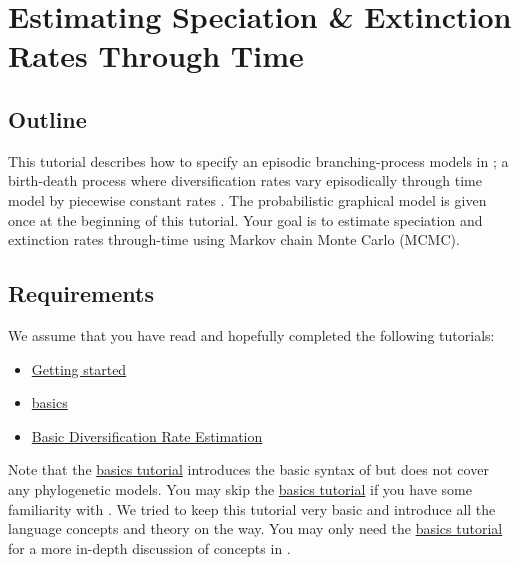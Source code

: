 \section{Estimating Speciation \& Extinction Rates Through Time}

\subsection{Outline}

This tutorial describes how to specify an episodic branching-process models in \RevBayes;
a birth-death process where diversification rates vary episodically through time model by piecewise constant rates \citep{Stadler2011,Hoehna2015a}.
The probabilistic graphical model is given once at the beginning of this tutorial.
Your goal is to estimate speciation and extinction rates through-time using Markov chain Monte Carlo (MCMC).


\subsection{Requirements}
We assume that you have read and hopefully completed the following tutorials:
\begin{itemize}
\item \href{https://github.com/revbayes/revbayes_tutorial/raw/master/tutorial_TeX/RB_Getting_Started/RB_Getting_Started.pdf}{Getting started}
\item \href{https://github.com/revbayes/revbayes_tutorial/raw/master/tutorial_TeX/RB_Basics_Tutorial/RB_Basics_Tutorial.pdf}{\Rev basics}
\item \href{https://github.com/revbayes/revbayes_tutorial/raw/master/tutorial_TeX/RB_DiversificationRate_Tutorial/RB_DiversificationRate_Tutorial.pdf}{Basic Diversification Rate Estimation}
\end{itemize}
Note that the \href{https://github.com/revbayes/revbayes_tutorial/raw/master/tutorial_TeX/RB_Basics_Tutorial/RB_Basics_Tutorial.pdf}{\Rev basics tutorial} introduces the basic syntax of \Rev but does not cover any phylogenetic models.
You may skip the \href{https://github.com/revbayes/revbayes_tutorial/raw/master/tutorial_TeX/RB_Basics_Tutorial/RB_Basics_Tutorial.pdf}{\Rev basics tutorial} if you have some familiarity with \R.
We tried to keep this tutorial very basic and introduce all the language concepts and theory on the way.
You may only need the \href{https://github.com/revbayes/revbayes_tutorial/raw/master/tutorial_TeX/RB_Basics_Tutorial/RB_Basics_Tutorial.pdf}{\Rev basics tutorial} for a more in-depth discussion of concepts in \Rev.


